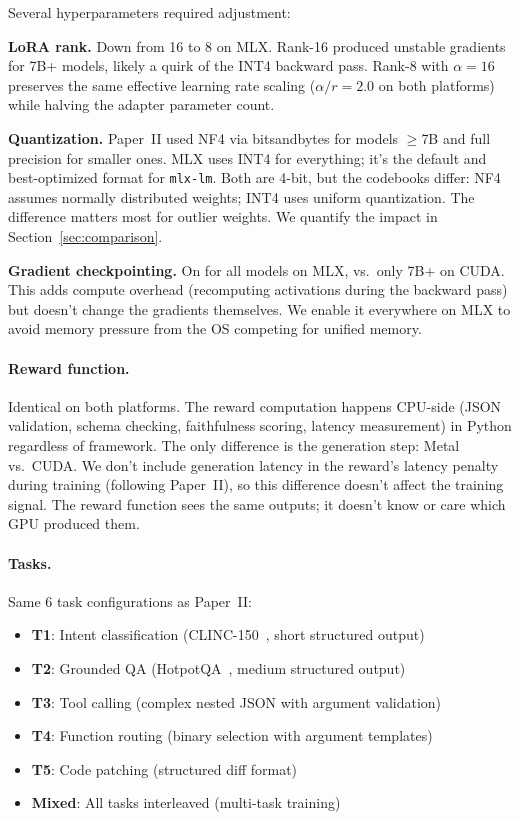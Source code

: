 \documentclass[11pt]{article}
\begin{document}
Several hyperparameters required adjustment:

\textbf{LoRA rank.}  Down from 16 to 8 on MLX.  Rank-16 produced unstable gradients for 7B+ models, likely a quirk of the INT4 backward pass.  Rank-8 with $\alpha = 16$ preserves the same effective learning rate scaling ($\alpha / r = 2.0$ on both platforms) while halving the adapter parameter count.

\textbf{Quantization.}  Paper~II used NF4 via bitsandbytes for models $\geq$7B and full precision for smaller ones.  MLX uses INT4 for everything; it's the default and best-optimized format for \texttt{mlx-lm}.  Both are 4-bit, but the codebooks differ: NF4 assumes normally distributed weights; INT4 uses uniform quantization.  The difference matters most for outlier weights.  We quantify the impact in Section~\ref{sec:comparison}.

\textbf{Gradient checkpointing.}  On for all models on MLX, vs.\ only 7B+ on CUDA.  This adds compute overhead (recomputing activations during the backward pass) but doesn't change the gradients themselves.  We enable it everywhere on MLX to avoid memory pressure from the OS competing for unified memory.

\paragraph{Reward function.}  Identical on both platforms.  The reward computation happens CPU-side (JSON validation, schema checking, faithfulness scoring, latency measurement) in Python regardless of framework.  The only difference is the generation step: Metal vs.\ CUDA.  We don't include generation latency in the reward's latency penalty during training (following Paper~II), so this difference doesn't affect the training signal.  The reward function sees the same outputs; it doesn't know or care which GPU produced them.

\paragraph{Tasks.} Same 6 task configurations as Paper~II:
\begin{itemize}[leftmargin=*]
\item \textbf{T1}: Intent classification (CLINC-150~\citep{larson2019clinc150}, short structured output)
\item \textbf{T2}: Grounded QA (HotpotQA~\citep{yang2018hotpotqa}, medium structured output)
\item \textbf{T3}: Tool calling (complex nested JSON with argument validation)
\item \textbf{T4}: Function routing (binary selection with argument templates)
\item \textbf{T5}: Code patching (structured diff format)
\item \textbf{Mixed}: All tasks interleaved (multi-task training)
\end{itemize}
\end{document}
